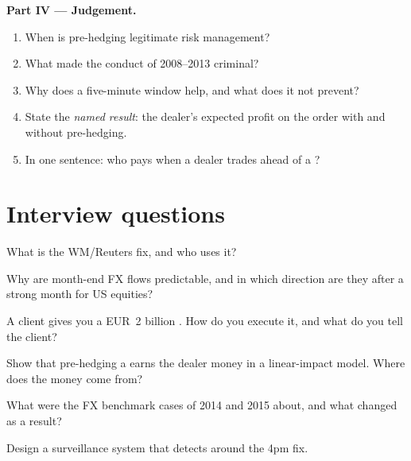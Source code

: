 \begin{problem}
\medskip\noindent\textbf{Part IV --- Judgement.}
\begin{enumerate}[resume]
\item When is pre-hedging legitimate risk management?
\item What made the conduct of 2008--2013 criminal?
\item Why does a five-minute window help, and what does it not prevent?
\item State the \emph{named result}: the dealer's expected profit on the order with
and without pre-hedging.
\item In one sentence: who pays when a dealer trades ahead of a ?
\end{enumerate}
\end{problem}

\section{Interview questions}

\begin{interviewq}\label{iq:m2:fixings-and-flows:1}
What is the WM/Reuters fix, and who uses it?
\end{interviewq}

\begin{interviewq}\label{iq:m2:fixings-and-flows:2}
Why are month-end FX flows predictable, and in which direction are they after
a strong month for US equities?
\end{interviewq}

\begin{interviewq}\label{iq:m2:fixings-and-flows:3}
A client gives you a EUR~2 billion . How do you execute it, and what
do you tell the client?
\end{interviewq}

\begin{interviewq}\label{iq:m2:fixings-and-flows:4}
Show that pre-hedging a  earns the dealer money in a linear-impact
model. Where does the money come from?
\end{interviewq}

\begin{interviewq}\label{iq:m2:fixings-and-flows:5}
What were the FX benchmark cases of 2014 and 2015 about, and what changed as a
result?
\end{interviewq}

\begin{interviewq}\label{iq:m2:fixings-and-flows:6}
Design a surveillance system that detects  around the 4pm fix.
\end{interviewq}
